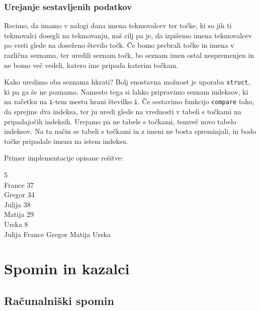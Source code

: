 \documentclass{book}
\begin{document}

\subsection{Urejanje sestavljenih podatkov}

Recimo, da imamo v nalogi dana imena tekmovalcev ter točke, ki so jih ti
tekmovalci dosegli na tekmovanju, naš cilj pa je, da izpišemo imena tekmovalcev
po vrsti glede na doseženo število točk. Če bomo prebrali točke in imena v
različna seznama, ter uredili seznam točk, bo seznam imen ostal nespremenjen in
ne bomo več vedeli, katero ime pripada katerim točkam.

Kako uredimo oba seznama hkrati? Bolj enostavna možnost je uporaba \verb+struct+,
ki pa ga še ne poznamo. Namesto tega si lahko pripravimo seznam indeksov, ki
na začetku na \verb+i+-tem mestu hrani številko \verb+i+. Če sestavimo funkcijo
\verb+compare+ tako, da sprejme dva indeksa, ter ju uredi glede na vrednosti
v tabeli s točkami na pripadajočih indeksih. Urejamo pa ne tabele s točkami,
temveč novo tabelo indeksov.
Na ta način se tabeli s točkami in z imeni ne bosta spreminjali,
in bodo točke pripadale imenu na istem indeksu.

\begin{examples}

Primer implementacije opisane rešitve:


\begin{inout}
  5 \\
  France 37 \\
  Gregor 34 \\
  Julija 38 \\
  Matija 29 \\
  Urska 8 \\
  \tcblower
  Julija
  France
  Gregor
  Matija
  Urska
\end{inout}

\end{examples}

\chapter{Spomin in kazalci}

\section{Računalniški spomin}
\end{document}
